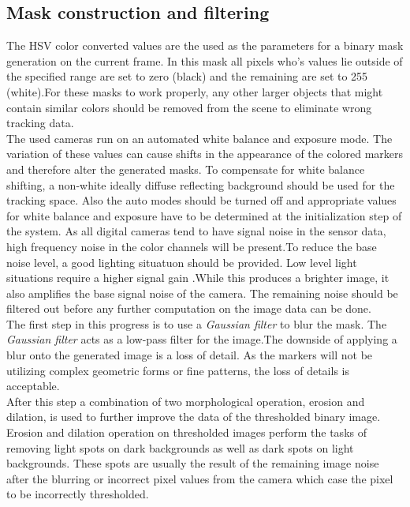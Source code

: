 \subsection{Mask construction and filtering}
The HSV color converted values are the used as the parameters for a binary mask generation on the current frame. In this mask all pixels who's values lie outside of the specified range are set to zero (black) and the remaining are set to 255 (white).For these masks to work properly, any other larger objects that might contain similar colors should be removed from the scene to eliminate wrong tracking data. \\The used cameras run on an automated white balance and exposure mode. The variation of these values can cause shifts in the appearance of the colored markers and therefore alter the generated masks. To compensate for white balance shifting, a non-white ideally diffuse reflecting background should be used for the tracking space. Also the auto modes should be turned off and appropriate values for white balance and exposure have to be determined at the initialization step of the system. As all digital cameras tend to have signal noise in the sensor data, high frequency noise in the color channels will be present.To reduce the base noise level, a good lighting situatuon should be provided. Low level light situations require a higher signal gain .While this produces a brighter image, it also amplifies the base signal noise of the camera. The remaining noise should be filtered out before any further computation on the image data can be done.\\
The first step in this progress is to use a \textit{Gaussian filter} to blur the mask.
The \textit{Gaussian filter} acts as a low-pass filter for the image.The downside of applying a blur onto the generated image is a loss of detail. As the markers will not be utilizing complex geometric forms or fine patterns, the loss of details is acceptable.\\
After this step a combination of two morphological operation, erosion and dilation, is used to further improve the data of the thresholded binary image\cite[chapter~3.11-12]{Davies.2017}.
Erosion and dilation operation on thresholded images perform the tasks of removing light spots on dark backgrounds as well as dark spots on light backgrounds. These spots are usually the result of the remaining image noise after the blurring or incorrect pixel values from the camera which case the pixel to be incorrectly thresholded.\\
